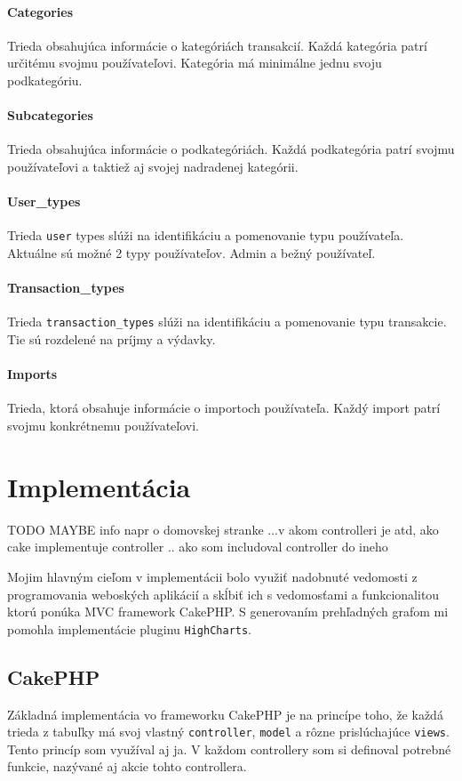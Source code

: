 \documentclass[12pt,oneside]{book}
\begin{document}
\subsubsection{Categories}
Trieda obsahujúca informácie o kategóriách transakcií. Každá kategória patrí určitému svojmu používateľovi. Kategória má minimálne jednu svoju podkategóriu.
\subsubsection{Subcategories}
Trieda obsahujúca informácie o podkategóriách. Každá podkategória patrí svojmu používateľovi a taktiež aj svojej nadradenej kategórii.
\subsubsection{User\_types}
Trieda \texttt{user} types slúži na identifikáciu a pomenovanie typu používateľa. Aktuálne sú možné 2 typy používateľov. Admin a bežný používateľ.
\subsubsection{Transaction\_types}
Trieda \texttt{transaction\_types} slúži na identifikáciu a pomenovanie typu transakcie. Tie sú rozdelené na príjmy a výdavky.
\subsubsection{Imports}
Trieda, ktorá obsahuje informácie o importoch používateľa. Každý import patrí svojmu konkrétnemu používateľovi.



\chapter{Implementácia}

TODO MAYBE
info napr o domovskej stranke ...v akom controlleri je atd, ako cake implementuje controller .. ako som includoval controller do ineho

Mojim hlavným cieľom v implementácii bolo využiť nadobnuté vedomosti z programovania weboských aplikácií a skĺbiť ich s vedomosťami a funkcionalitou ktorú ponúka MVC framework CakePHP. S generovaním prehľadných grafom mi pomohla implementácie pluginu \texttt{HighCharts}. 

\section{CakePHP}
Základná implementácia vo frameworku CakePHP je na princípe toho, že každá trieda z tabuľky má svoj vlastný \texttt{controller}, \texttt{model} a rôzne prislúchajúce \texttt{views}. Tento princíp som využíval aj ja. V každom controllery som si definoval potrebné funkcie, nazývané aj akcie tohto controllera. 
\end{document}
